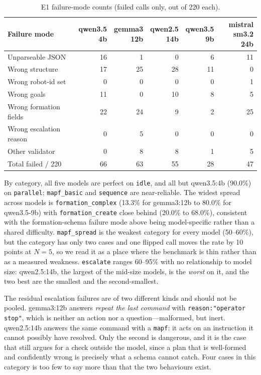 \documentclass[10pt,twocolumn]{article}
\newcommand{\code}[1]{\texttt{\small #1}}
\begin{document}
\begin{table}[t]
\centering\footnotesize
\setlength{\tabcolsep}{2pt}
\caption{E1 failure-mode counts (failed calls only, out of 220 each).}
\label{tab:e1-failuremodes}
\begin{tabular}{lrrrrr}
\toprule
Failure mode & \makecell{qwen3.5\\4b} & \makecell{gemma3\\12b} & \makecell{qwen2.5\\14b} & \makecell{qwen3.5\\9b} & \makecell{mistral\\sm3.2 24b} \\
\midrule
Unparseable JSON    & 16 &  1 &  0 &  6 & 11 \\
Wrong structure      & 17 & 25 & 28 & 11 &  0 \\
Wrong robot-id set    &  0 &  0 &  0 &  0 &  1 \\
Wrong goals            & 11 &  0 & 10 &  8 &  5 \\
Wrong formation fields  & 22 & 24 &  9 &  2 & 25 \\
Wrong escalation reason  &  0 &  5 &  0 &  0 &  0 \\
Other validator          &  0 &  8 &  8 &  1 &  5 \\
\midrule
Total failed / 220        & 66 & 63 & 55 & 28 & 47 \\
\bottomrule
\end{tabular}
\end{table}

By category, all five models are perfect on \code{idle}, and all but
qwen3.5:4b (90.0\%) on \code{parallel}; \code{mapf\_basic} and \code{sequence}
are near-reliable. The widest spread across models is
\code{formation\_complex} (13.3\% for gemma3:12b to 80.0\% for qwen3.5-9b) with
\code{formation\_create} close behind (20.0\% to 68.0\%), consistent with the
formation-schema failure mode above being model-specific rather than a shared
difficulty. \code{mapf\_spread} is the weakest category for every model
(50--60\%), but the category has only two cases and one flipped call moves the
rate by 10 points at $N{=}5$, so we read it as a place where the benchmark is
thin rather than as a measured weakness. \code{escalate} ranges 60--95\% with
no relationship to model size: qwen2.5:14b, the largest of the mid-size
models, is the \emph{worst} on it, and the two best are the smallest and the
second-smallest.

The residual escalation failures are of two
different kinds and should not be pooled. gemma3:12b answers \emph{repeat the
last command} with \code{reason:"operator stop"}, which is neither an action
nor a question---malformed, but inert. qwen2.5:14b answers the same command
with a \code{mapf}: it acts on an instruction it cannot possibly have
resolved. Only the second is dangerous, and it is the case that still argues
for a check outside the model, since a plan that is well-formed and confidently
wrong is precisely what a schema cannot catch. Four cases in this category is
too few to say more than that the two behaviours exist.
\end{document}

